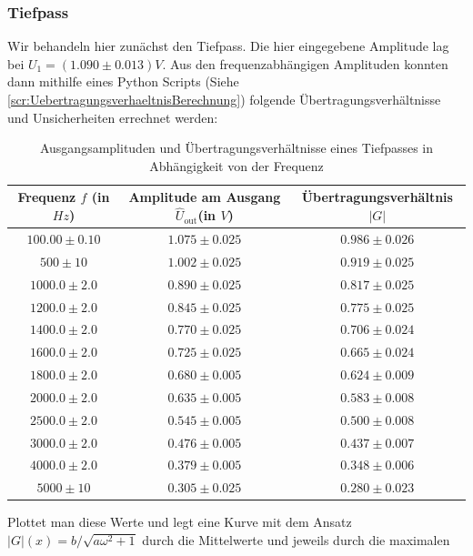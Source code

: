 \documentclass{report}
\begin{document}
\subsubsection{Tiefpass}
Wir behandeln hier zunächst den Tiefpass.
Die hier eingegebene Amplitude lag bei $U_1 = (1.090 \pm 0.013)\si{V}$.
Aus den frequenzabhängigen Amplituden konnten dann mithilfe eines Python Scripts (Siehe \ref{scr:UebertragungsverhaeltnisBerechnung}) folgende Übertragungs\-verhältnisse und Unsicherheiten 
errechnet werden:
\begin{table}[H]
    \centering
    \label{tab:TPAmps}
    \begin{tabular}{| c | c | c |}
        \hline
        Frequenz $f$ (in $\si{Hz}$) &  Amplitude am Ausgang $\hat{U}_{\mathrm{out}}$(in $V$) & Übertragungsverhältnis $\left\lvert G \right\rvert$\\
        \hline
        $100.00 \pm 0.10$ & $1.075 \pm 0.025$ & $0.986 \pm 0.026$ \\
        $500 \pm 10$ & $1.002 \pm 0.025$ & $0.919 \pm 0.025$ \\
        $1000.0 \pm 2.0$ & $0.890 \pm 0.025$ & $0.817 \pm 0.025$ \\
        $1200.0 \pm 2.0$ & $0.845 \pm 0.025$ & $0.775 \pm 0.025$ \\
        $1400.0 \pm 2.0$ & $0.770 \pm 0.025$ & $0.706 \pm 0.024$ \\
        $1600.0 \pm 2.0$ & $0.725 \pm 0.025$ & $0.665 \pm 0.024$ \\
        $1800.0 \pm 2.0$ & $0.680 \pm 0.005$ & $0.624 \pm 0.009$ \\
        $2000.0 \pm 2.0$ & $0.635 \pm 0.005$ & $0.583 \pm 0.008$ \\
        $2500.0 \pm 2.0$ & $0.545 \pm 0.005$ & $0.500 \pm 0.008$ \\
        $3000.0 \pm 2.0$ & $0.476 \pm 0.005$ & $0.437 \pm 0.007$ \\
        $4000.0 \pm 2.0$ & $0.379 \pm 0.005$ & $0.348 \pm 0.006$ \\
        $5000 \pm 10$ & $0.305 \pm 0.025$ & $0.280 \pm 0.023$ \\
        \hline
    \end{tabular}
    \caption{Ausgangsamplituden und Übertragungsverhältnisse eines Tiefpasses in Abhängigkeit von der Frequenz}
\end{table}
\noindent
Plottet man diese Werte und legt eine Kurve mit dem Ansatz $\left\lvert G \right\rvert(x) = b/\sqrt{a\omega^2 + 1}$ durch die Mittelwerte und jeweils durch die maximalen
\end{document}
